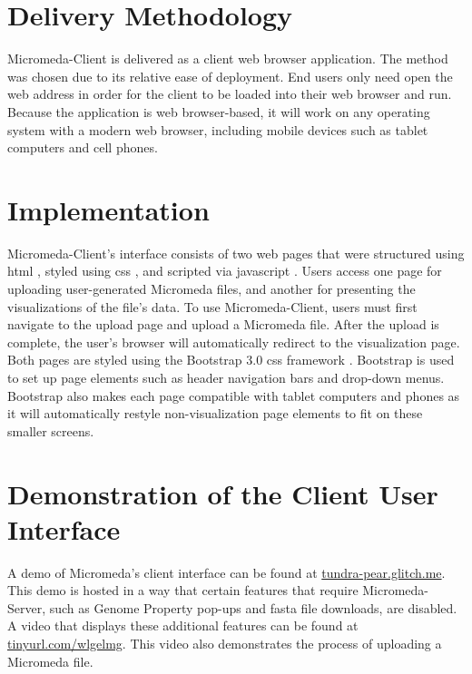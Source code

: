 \section{Delivery Methodology} \label{client-delivery-method}

Micromeda-Client is delivered as a client web browser application. The method 
was chosen due to its relative ease of deployment. End users only need open the 
web address in order for the client to be loaded into their web browser and run. 
Because the application is web browser-based, it will work on any operating 
system with a modern web browser, including mobile devices such as tablet 
computers and cell phones.

\section{Implementation} \label{client-implementation}

Micromeda-Client's interface consists of two web pages that were structured 
using \gls{html} \cite{HTML5}, styled using \gls{css} \cite{CSS3}, and scripted 
via \gls{javascript} \cite{flanagan2006javascript}. Users access one page for 
uploading user-generated Micromeda files, and another for presenting the 
visualizations of the file's data. To use Micromeda-Client, users must first 
navigate to the upload page and upload a Micromeda file. After the upload is 
complete, the user's browser will automatically redirect to the visualization 
page. Both pages are styled using the Bootstrap 3.0 \gls{css} framework 
\cite{spurlock2013bootstrap}. Bootstrap is used to set up page elements such as 
header navigation bars and drop-down menus. Bootstrap also makes each page 
compatible with tablet computers and phones as it will automatically restyle 
non-visualization page elements to fit on these smaller screens.

\section{Demonstration of the Client User Interface} \label{client-demo}

A demo of Micromeda’s client interface can be found at
\href{http://tundra-pear.glitch.me}{tundra-pear.glitch.me}. This demo is 
hosted in a way that certain features that require Micromeda-Server, such as 
Genome Property pop-ups and \gls{fasta} file downloads, are disabled. A video 
that displays these additional features can be found at
\href{https://tinyurl.com/wlgelmg}{tinyurl.com/wlgelmg}. 
This video also demonstrates the process of uploading a Micromeda file.

